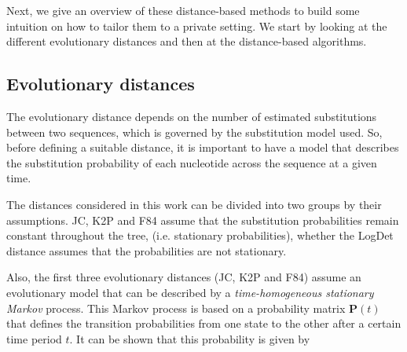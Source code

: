 Next, we give an overview of these distance-based methods to build some intuition on how to tailor them to a private setting. We start by looking at the different evolutionary distances and then at the distance-based algorithms.

\subsection{Evolutionary distances} \label{evolDist}

The evolutionary distance depends on the number of estimated substitutions between two sequences, which is governed by the substitution model used. So, before defining a suitable distance, it is important to have a model that describes the substitution probability of each nucleotide across the sequence at a given time. 

The distances considered in this work can be divided into two groups by their assumptions. JC, K2P and F84 assume that the substitution probabilities remain constant throughout the tree, (i.e. stationary probabilities), whether the LogDet distance assumes that the probabilities are not stationary.  






Also, the first three evolutionary distances (JC, K2P and F84) assume an evolutionary model that can be described by a \textit{time-homogeneous stationary Markov} process. %
This Markov process is based on a probability matrix $\mathbf{P}(t)$ that defines the transition probabilities from one state to the other after a certain time period $t$. It can be shown \cite{PM09} %
that this probability is given by 

